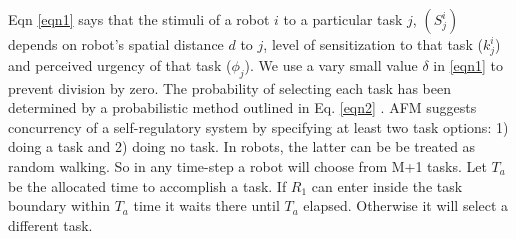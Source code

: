 \documentclass[a4paper, 10pt, conference]{ieeeconf}      %
\begin{document}
Eqn \ref{eqn1} says that the stimuli of a robot $i$ to a particular task $j$, $(S_{j}^{i})$ depends on robot's spatial distance $d$ to $j$, level of sensitization to that task ($k_{j}^{i}$) and perceived urgency of that task ($\phi _{j}$). We use a vary small value $\delta$ in \ref{eqn1} to prevent  division by zero. The probability of selecting each task has been determined by a probabilistic method outlined in Eq. \ref{eqn2} . 
AFM suggests concurrency of a self-regulatory system by specifying at least two task options: 1) doing a task and 2) doing no task. In robots, the latter can be   be treated as random walking. So in any time-step a robot will choose from M+1 tasks. Let $T_a$ be the allocated time to accomplish a task. If $R_1$ can enter inside the task boundary within $T_a$ time it waits there until $T_a$ elapsed. Otherwise it will select a different task. 
\end{document}
